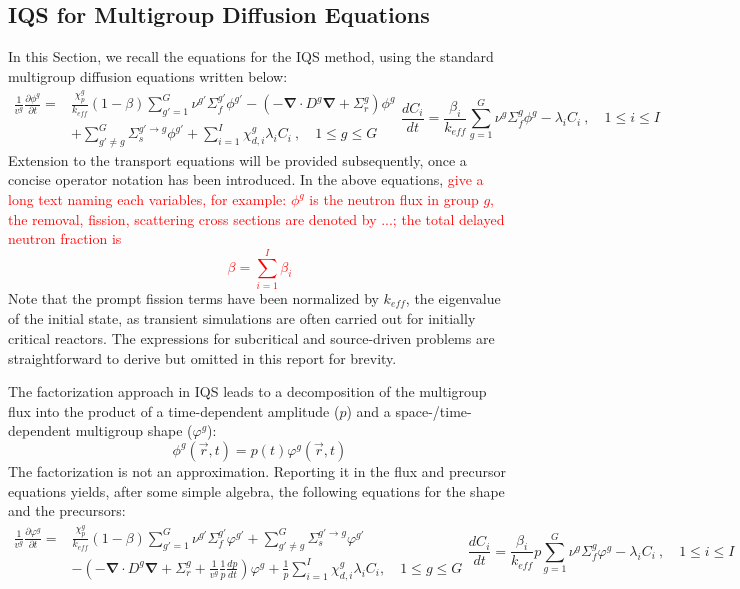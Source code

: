 \documentclass[12pt]{scrartcl}
\renewcommand{\div}{\bs{\nabla}\! \cdot \!}
\newcommand{\grad}{\bs{\nabla}}
\newcommand{\bs}[1]{\mathbf{#1}}
\newcommand{\keff}{k_\textit{eff}}
\newcommand{\be}{\begin{equation}}
\newcommand{\ee}{\end{equation}}
\newcommand{\tcr}[1]{\textcolor{red}{#1}}
\begin{document}
\subsection{IQS for Multigroup Diffusion Equations}

In this Section, we recall the equations for the IQS method, using the standard multigroup diffusion equations written below:
\begin{subequations}
\begin{align}
\frac{1}{v^g} \frac{\partial \phi^g }{\partial t} =& \frac{\chi_p^g}{\keff} (1-\beta)\sum_{g'=1}^G  \nu^{g'} \Sigma_f^{g'} \phi^{g'} -  \left( -\div D^g \grad  + \Sigma_r^g \right) \phi^g  \nonumber \\
&  + \sum_{g'\neq g}^G\Sigma_s^{g'\to g} \phi^{g'}  + \sum_{i=1}^I\chi_{d,i}^g\lambda_i C_i \ , \quad 1 \le g \le G 
\label{eq:flux}
\end{align}
\be
\frac{dC_i}{dt} = \frac{\beta_i}{\keff}\sum_{g=1}^G\nu^{g} \Sigma_f^g \phi^{g} - \lambda_i C_i \ , \quad 1 \le i \le I 
\label{eq:precursor}
\ee
\end{subequations}
%
Extension to the transport equations will be provided subsequently, once a concise operator notation has been introduced. 
In the above equations, \tcr{give a long text naming each variables, for example: $\phi^g$ is the neutron flux in group $g$, the removal, fission, scattering cross sections are denoted by ...; the total delayed neutron fraction is 
\[
\beta = \sum_{i=1}^I \beta_{i} 
\]
}
Note that the prompt fission terms have been normalized by $\keff$, the eigenvalue of the initial state, as transient simulations are often carried out for initially critical reactors. The expressions for subcritical and source-driven problems are straightforward to derive but omitted in this report for brevity.

The factorization approach in IQS leads to a decomposition of the multigroup flux into the product of a time-dependent amplitude ($p$) and a space-/time-dependent multigroup shape ($\varphi^g$):
\be
\phi^g(\vec{r},t)=p(t)\varphi^g(\vec{r},t)
\ee
The factorization is not an approximation. Reporting it in the flux and precursor equations yields, after some simple algebra, the following equations for the shape and the precursors:
\begin{subequations}
\begin{align}
\frac{1}{v^g}\frac{\partial\varphi^g}{\partial t} = &\frac{\chi_p^g}{\keff} (1-\beta)\sum_{g'=1}^G  \nu^{g'} \Sigma_f^{g'} \varphi^{g'} + \sum_{g'\neq g}^G\Sigma_s^{g'\to g} \varphi^{g'} \nonumber \\ 
& -  \left( -\div D^g \grad  + \Sigma_r^g + \frac{1}{v^g}\frac{1}{p}\frac{dp}{dt}\right) \varphi^g + \frac{1}{p}\sum_{i=1}^I\chi_{d,i}^g\lambda_iC_i  , \quad 1 \le g \le G 
\label{eq:shape2}
\end{align}
\be
\frac{dC_i}{dt} = \frac{\beta_i}{\keff}p \sum_{g=1}^G\nu^{g} \Sigma_f^g \varphi^{g} - \lambda_i C_i \ , \quad 1 \le i \le I 
\label{eq:preq2}
\ee
\end{subequations}
\end{document}

